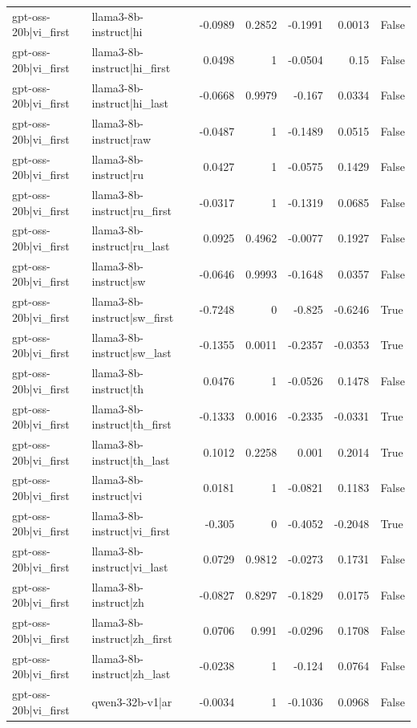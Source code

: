 \begin{table}
\begin{tabular}{l l r r r r l}
gpt-oss-20b|vi_first & llama3-8b-instruct|hi & -0.0989 & 0.2852 & -0.1991 & 0.0013 & False \\
gpt-oss-20b|vi_first & llama3-8b-instruct|hi_first & 0.0498 & 1 & -0.0504 & 0.15 & False \\
gpt-oss-20b|vi_first & llama3-8b-instruct|hi_last & -0.0668 & 0.9979 & -0.167 & 0.0334 & False \\
gpt-oss-20b|vi_first & llama3-8b-instruct|raw & -0.0487 & 1 & -0.1489 & 0.0515 & False \\
gpt-oss-20b|vi_first & llama3-8b-instruct|ru & 0.0427 & 1 & -0.0575 & 0.1429 & False \\
gpt-oss-20b|vi_first & llama3-8b-instruct|ru_first & -0.0317 & 1 & -0.1319 & 0.0685 & False \\
gpt-oss-20b|vi_first & llama3-8b-instruct|ru_last & 0.0925 & 0.4962 & -0.0077 & 0.1927 & False \\
gpt-oss-20b|vi_first & llama3-8b-instruct|sw & -0.0646 & 0.9993 & -0.1648 & 0.0357 & False \\
gpt-oss-20b|vi_first & llama3-8b-instruct|sw_first & -0.7248 & 0 & -0.825 & -0.6246 & True \\
gpt-oss-20b|vi_first & llama3-8b-instruct|sw_last & -0.1355 & 0.0011 & -0.2357 & -0.0353 & True \\
gpt-oss-20b|vi_first & llama3-8b-instruct|th & 0.0476 & 1 & -0.0526 & 0.1478 & False \\
gpt-oss-20b|vi_first & llama3-8b-instruct|th_first & -0.1333 & 0.0016 & -0.2335 & -0.0331 & True \\
gpt-oss-20b|vi_first & llama3-8b-instruct|th_last & 0.1012 & 0.2258 & 0.001 & 0.2014 & True \\
gpt-oss-20b|vi_first & llama3-8b-instruct|vi & 0.0181 & 1 & -0.0821 & 0.1183 & False \\
gpt-oss-20b|vi_first & llama3-8b-instruct|vi_first & -0.305 & 0 & -0.4052 & -0.2048 & True \\
gpt-oss-20b|vi_first & llama3-8b-instruct|vi_last & 0.0729 & 0.9812 & -0.0273 & 0.1731 & False \\
gpt-oss-20b|vi_first & llama3-8b-instruct|zh & -0.0827 & 0.8297 & -0.1829 & 0.0175 & False \\
gpt-oss-20b|vi_first & llama3-8b-instruct|zh_first & 0.0706 & 0.991 & -0.0296 & 0.1708 & False \\
gpt-oss-20b|vi_first & llama3-8b-instruct|zh_last & -0.0238 & 1 & -0.124 & 0.0764 & False \\
gpt-oss-20b|vi_first & qwen3-32b-v1|ar & -0.0034 & 1 & -0.1036 & 0.0968 & False \\

\end{tabular}
\end{table}
